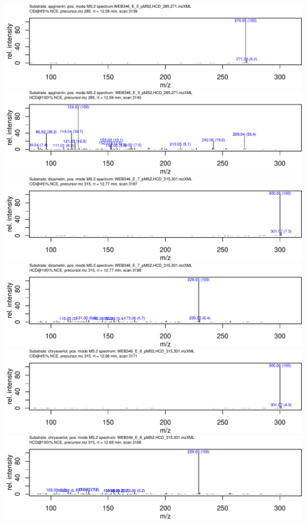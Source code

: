 \documentclass[]{article}
\begin{document}
\includegraphics{flavones_products_files/figure-latex/tikz_plot-1.pdf}
\includegraphics{flavones_products_files/figure-latex/tikz_plot-2.pdf}
\includegraphics{flavones_products_files/figure-latex/tikz_plot-3.pdf}
\includegraphics{flavones_products_files/figure-latex/tikz_plot-4.pdf}
\includegraphics{flavones_products_files/figure-latex/tikz_plot-5.pdf}
\includegraphics{flavones_products_files/figure-latex/tikz_plot-6.pdf}
\end{document}
